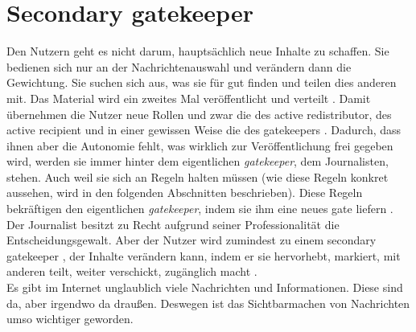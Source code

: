 \section{Secondary gatekeeper} \label{sec:secondary-gate}
Den Nutzern geht es nicht darum, hauptsächlich neue Inhalte zu schaffen. Sie
bedienen sich nur an der Nachrichtenauswahl und verändern dann die Gewichtung.
Sie suchen sich aus, was sie für gut finden und teilen dies anderen mit. Das
Material wird ein zweites Mal veröffentlicht und verteilt
\autocite[S.~66]{singer:2014}. Damit übernehmen die Nutzer neue Rollen und zwar
die des \glqq active redistributor\grqq, des \glqq active recipient\grqq\- und in einer gewissen
Weise die des \glqq gatekeepers\grqq\- \autocite[S.~57]{singer:2014}. Dadurch, dass ihnen
aber die Autonomie fehlt, was wirklich zur Veröffentlichung frei gegeben wird,
werden sie immer hinter dem eigentlichen \emph{gatekeeper}, dem Journalisten,
stehen. Auch weil sie sich an Regeln halten müssen (wie diese Regeln konkret
aussehen, wird in den folgenden Abschnitten beschrieben). Diese Regeln
bekräftigen den eigentlichen \emph{gatekeeper}, indem sie ihm eine neues \glqq gate\grqq\-
liefern \autocite[S.~13]{santana:2014}.\\
Der Journalist besitzt zu Recht aufgrund seiner Professionalität die
Entscheidungsgewalt. Aber der Nutzer wird zumindest zu einem \glqq secondary
gatekeeper\grqq\- \autocite[S.~5]{santana:2014}, der Inhalte verändern kann, indem er
sie hervorhebt, markiert, mit anderen teilt, weiter verschickt, zugänglich macht
\autocite[S.~57]{singer:2014}.\\
Es gibt im Internet unglaublich viele Nachrichten und Informationen. Diese sind
da, aber irgendwo \glqq da draußen\grqq. Deswegen ist das \glqq
Sichtbarmachen\grqq\- von Nachrichten umso wichtiger geworden.

